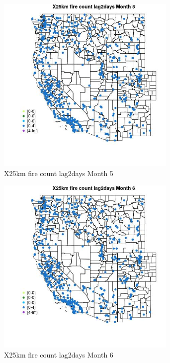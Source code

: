 \begin{figure} 
\centering  
\includegraphics[width=0.77\textwidth]{Code_Outputs/Report_ML_input_PM25_Step4_part_e_de_duplicated_aves_compiled_2019-05-14wNAs_MapObsMo5X25km_fire_count_lag2days.jpg} 
\caption{\label{fig:Report_ML_input_PM25_Step4_part_e_de_duplicated_aves_compiled_2019-05-14wNAsMapObsMo5X25km_fire_count_lag2days}X25km fire count lag2days Month 5} 
\end{figure} 
 

\begin{figure} 
\centering  
\includegraphics[width=0.77\textwidth]{Code_Outputs/Report_ML_input_PM25_Step4_part_e_de_duplicated_aves_compiled_2019-05-14wNAs_MapObsMo6X25km_fire_count_lag2days.jpg} 
\caption{\label{fig:Report_ML_input_PM25_Step4_part_e_de_duplicated_aves_compiled_2019-05-14wNAsMapObsMo6X25km_fire_count_lag2days}X25km fire count lag2days Month 6} 
\end{figure} 
 

